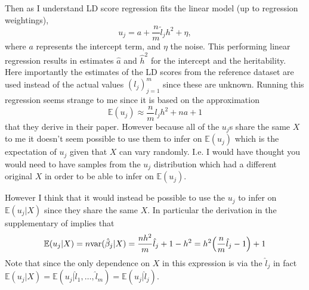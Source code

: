 Then as I understand LD score regression fits the linear model (up to regression weightings),
\begin{equation*}
	u_j = a + \frac{n}{m}\tilde{l}_j h^2 + \eta,
\end{equation*}
where $ a $ represents the intercept term, and $ \eta $ the noise. This performing linear regression results in estimates $ \hat{a} $ and $ \hat{h}^2$ for the intercept and the heritability. Here importantly the estimates of the LD scores from the reference dataset are used instead of the actual values $ (l_j)_{j = 1}^m $ since these are unknown. Running this regression seems strange to me since it is based on the approximation
\begin{equation*}
	\mathbb{E}(u_j) \approx\frac{n}{m}l_j h^2 + na + 1
\end{equation*}
that they derive in their paper. However because all of the $ u_j $s share the same $ X $ to me it doesn't seem possible to use them to infer on $ \mathbb{E}(u_j) $ which is the expectation of $ u_j $ given that $ X $ can vary randomly. I.e. I would have thought you would need to have samples from the $ u_j $ distribution which had a different original $ X $ in order to be able to infer on $ \mathbb{E}(u_j) $.

However I think that it would instead be possible to use the $ u_j $ to infer on $ \mathbb{E}(u_j|X) $ since they share the same $ X $. In particular the derivation in the supplementary of \cite{Bulik2015} implies that 
\begin{align*}
	 \mathbb{E}(u_j|X) = n\var(\hat{\beta}_j| X) = \frac{nh^2}{m}\hat{l}_j + 1-h^2= h^2\left(\frac{n}{m}\hat{l}_j - 1\right) + 1
\end{align*} 
Note that since the only dependence on $ X $ in this expression is via the $ \hat{l}_j $  in fact $ \mathbb{E}(u_j|X) = \mathbb{E}(u_j| \hat{l}_1, \dots, \hat{l}_m) = \mathbb{E}(u_j|\hat{l}_j) $.\\

